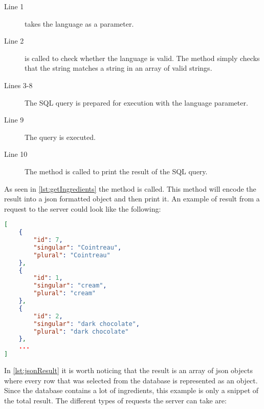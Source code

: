 \begin{description}
\item[Line 1]  takes the language as a parameter.
\item[Line 2]  is called to check whether the language is valid. The method simply checks that the string matches a string in an array of valid strings.
\item[Lines 3-8] The SQL query is prepared for execution with the language parameter.
\item[Line 9] The query is executed.
\item[Line 10] The  method is called to print the result of the SQL query.
\end{description}

As seen in \autoref{lst:getIngredients} the method  is called. This method will encode the result into a \ac{json} formatted object and then print it. An example of result from a request to the server could look like the following:

\begin{lstlisting}[language=json, label=lst:jsonResult, caption=Example result from \colorbox{background}{getIngredients()}.]
[
    {
        "id": 7,
        "singular": "Cointreau",
        "plural": "Cointreau"
    },
    {
        "id": 1,
        "singular": "cream",
        "plural": "cream"
    },
    {
        "id": 2,
        "singular": "dark chocolate",
        "plural": "dark chocolate"
    },
    ...
]
\end{lstlisting}
In \autoref{lst:jsonResult} it is worth noticing that the result is an array of \ac{json} objects where every row that was selected from the database is represented as an object. Since the database contains a lot of ingredients, this example is only a snippet of the total result. The different types of requests the server can take are:

